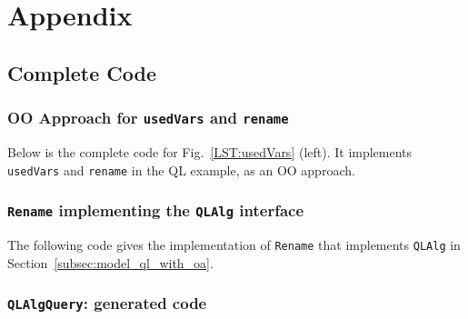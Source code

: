 \clearpage

\section{Appendix}\label{sec:appendix}

\subsection{Complete Code}

\subsubsection{OO Approach for \lstinline{usedVars} and \lstinline{rename}}\label{subsec:appendix_code_oo_approach}

Below is the complete code for Fig.~\ref{LST:usedVars} (left). It implements \lstinline{usedVars} and \lstinline{rename} in the QL example, as an OO approach.


\subsubsection{\lstinline{Rename} implementing the \lstinline{QLAlg} interface}\label{subsec:appendix_code_rename}

The following code gives the implementation of \lstinline{Rename} that implements \lstinline{QLAlg} in Section~\ref{subsec:model_ql_with_oa}.


\begin{comment}
\subsubsection{\lstinline{SetMonoid}}\label{subsec:appendix_code_setmonoid}

The implementation of \lstinline{SetMonoid} for Fig.~\ref{ql_with_oaframework} and Section~\ref{subsec:solvingfreevars}.

\end{comment}

\subsubsection{\lstinline{QLAlgQuery}: generated code}\label{subsec:appendix_code_qlalgquery}

